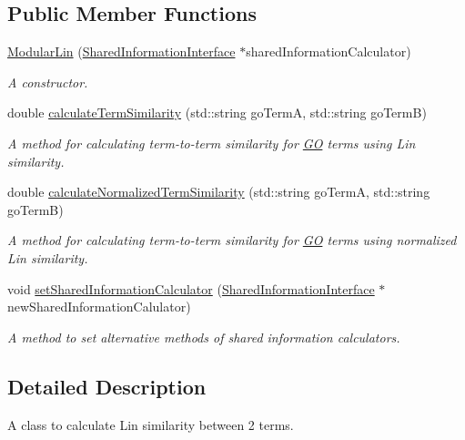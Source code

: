 \subsection*{Public Member Functions}
\begin{DoxyCompactItemize}
\item 
\hyperlink{classModularLin_a1d70b04bb6d75af7d86da15f33bb1732}{Modular\+Lin} (\hyperlink{classSharedInformationInterface}{Shared\+Information\+Interface} $\ast$shared\+Information\+Calculator)
\begin{DoxyCompactList}\small\item\em A constructor. \end{DoxyCompactList}\item 
double \hyperlink{classModularLin_a995ef9e4c53b9e96a32259157416df1b}{calculate\+Term\+Similarity} (std\+::string go\+TermA, std\+::string go\+TermB)
\begin{DoxyCompactList}\small\item\em A method for calculating term-\/to-\/term similarity for \hyperlink{namespaceGO}{GO} terms using Lin similarity. \end{DoxyCompactList}\item 
double \hyperlink{classModularLin_a5c4c590808542669e7ba65b60ea8f707}{calculate\+Normalized\+Term\+Similarity} (std\+::string go\+TermA, std\+::string go\+TermB)
\begin{DoxyCompactList}\small\item\em A method for calculating term-\/to-\/term similarity for \hyperlink{namespaceGO}{GO} terms using normalized Lin similarity. \end{DoxyCompactList}\item 
void \hyperlink{classModularLin_a2730653a908d1d3ae8d379d166906646}{set\+Shared\+Information\+Calculator} (\hyperlink{classSharedInformationInterface}{Shared\+Information\+Interface} $\ast$new\+Shared\+Information\+Calulator)
\begin{DoxyCompactList}\small\item\em A method to set alternative methods of shared information calculators. \end{DoxyCompactList}\end{DoxyCompactItemize}


\subsection{Detailed Description}
A class to calculate Lin similarity between 2 terms. 

